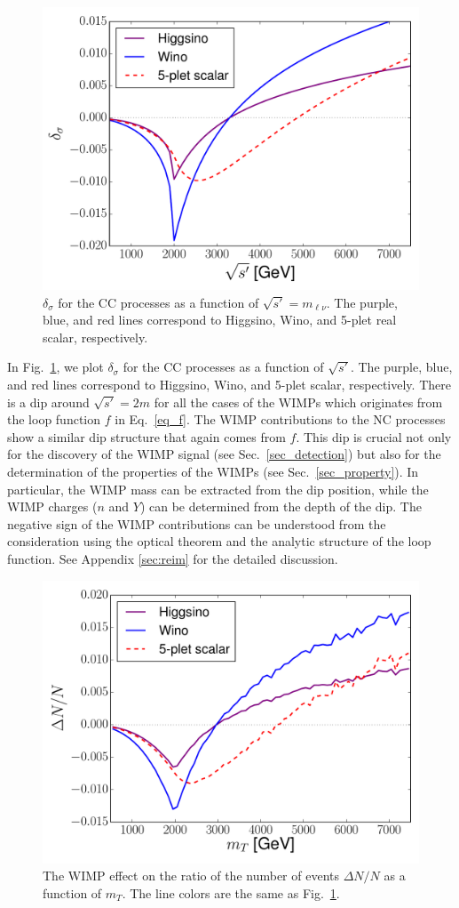 \documentclass[12pt,twoside,book]{article}
\begin{document}
\begin{figure}[t]
  \centering
  \includegraphics[width=0.5\hsize]{sqsp_vs_del.pdf}
  \caption{
    $\delta_\sigma$ for the CC processes as a function of $\sqrt{s'} = m_{\ell\nu}$.
    The purple, blue, and red lines correspond to Higgsino, Wino, and 5-plet real scalar, respectively.
  }
  \label{fig_sqsp_vs_del}
\end{figure}

In Fig.~\ref{fig_sqsp_vs_del}, we plot $\delta_\sigma$ for the CC processes as a function of $\sqrt{s'}$.
The purple, blue, and red lines correspond to Higgsino, Wino, and 5-plet scalar, respectively.
There is a dip around $\sqrt{s'} = 2m$ for all the cases of the WIMPs which originates from the loop function $f$ in Eq.~\eqref{eq_f}.
The WIMP contributions to the NC processes show a similar dip structure that again comes from $f$.
This dip is crucial not only for the discovery of the WIMP signal (see Sec.~\ref{sec_detection}) but also for the determination of the properties of the WIMPs (see Sec.~\ref{sec_property}).
In particular, the WIMP mass can be extracted from the dip position, while the WIMP charges ($n$ and $Y$) can be determined from the depth of the dip.
The negative sign of the WIMP contributions can be understood from the consideration using the optical theorem and the analytic structure of the loop function.
See Appendix \ref{sec:reim} for the detailed discussion.

\begin{figure}[t]
  \centering
  \includegraphics[width=0.5\hsize]{mT_vs_del.pdf}
  \caption{
    The WIMP effect on the ratio of the number of events $\Delta N / N$ as a function of $m_T$.
    The line colors are the same as Fig.~\ref{fig_sqsp_vs_del}.
  }
  \label{fig_mT_vs_dN}
\end{figure}
\end{document}
